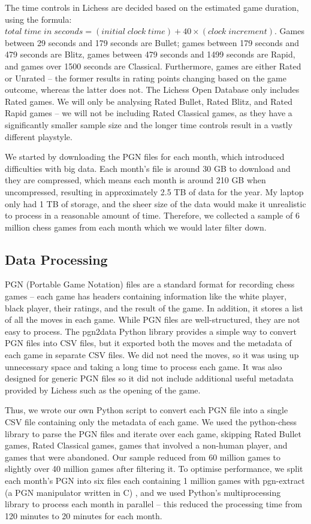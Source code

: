\documentclass[a4paper, 11pt]{article}
\begin{document}
The time controls in Lichess are decided based on the estimated game duration, using the formula: $total \; time \; in \; seconds = (initial \; clock \; time) + 40 \times (clock \; increment)$. Games between 29 seconds and 179 seconds are Bullet; games between 179 seconds and 479 seconds are Blitz, games between 479 seconds and 1499 seconds are Rapid, and games over 1500 seconds are Classical. Furthermore, games are either Rated or Unrated -- the former results in rating points changing based on the game outcome, whereas the latter does not. The Lichess Open Database only includes Rated games. We will only be analysing Rated Bullet, Rated Blitz, and Rated Rapid games -- we will not be including Rated Classical games, as they have a significantly smaller sample size and the longer time controls result in a vastly different playstyle.

We started by downloading the PGN files for each month, which introduced difficulties with big data. Each month's file is around 30 GB to download and they are compressed, which means each month is around 210 GB when uncompressed, resulting in approximately 2.5 TB of data for the year. My laptop only had 1 TB of storage, and the sheer size of the data would make it unrealistic to process in a reasonable amount of time. Therefore, we collected a sample of 6 million chess games from each month which we would later filter down.

\subsection{Data Processing}
PGN (Portable Game Notation) files are a standard format for recording chess games -- each game has headers containing information like the white player, black player, their ratings, and the result of the game. In addition, it stores a list of all the moves in each game. While PGN files are well-structured, they are not easy to process. The pgn2data Python library \cite{pgn2dataGitHub} provides a simple way to convert PGN files into CSV files, but it exported both the moves and the metadata of each game in separate CSV files. We did not need the moves, so it was using up unnecessary space and taking a long time to process each game. It was also designed for generic PGN files so it did not include additional useful metadata provided by Lichess such as the opening of the game.

Thus, we wrote our own Python script to convert each PGN file into a single CSV file containing only the metadata of each game. We used the python-chess library to parse the PGN files and iterate over each game, skipping Rated Bullet games, Rated Classical games, games that involved a non-human player, and games that were abandoned. Our sample reduced from 60 million games to slightly over 40 million games after filtering it. To optimise performance, we split each month's PGN into six files each containing 1 million games with pgn-extract (a PGN manipulator written in C) \cite{pgnExtractGitHub}, and we used Python's multiprocessing library to process each month in parallel -- this reduced the processing time from 120 minutes to 20 minutes for each month.
\end{document}
